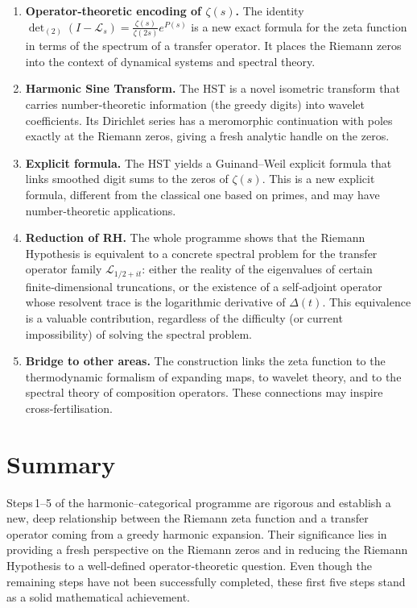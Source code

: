 \documentclass[11pt,a4paper]{article}
\begin{document}
\begin{enumerate}
\item \textbf{Operator‑theoretic encoding of \(\zeta(s)\).}  The identity \(\det_{(2)}(I-\mathcal{L}_s)=\frac{\zeta(s)}{\zeta(2s)}e^{P(s)}\) is a new exact formula for the zeta function in terms of the spectrum of a transfer operator.  It places the Riemann zeros into the context of dynamical systems and spectral theory.

\item \textbf{Harmonic Sine Transform.}  The HST is a novel isometric transform that carries number‑theoretic information (the greedy digits) into wavelet coefficients.  Its Dirichlet series has a meromorphic continuation with poles exactly at the Riemann zeros, giving a fresh analytic handle on the zeros.

\item \textbf{Explicit formula.}  The HST yields a Guinand–Weil explicit formula that links smoothed digit sums to the zeros of \(\zeta(s)\).  This is a new explicit formula, different from the classical one based on primes, and may have number‑theoretic applications.

\item \textbf{Reduction of RH.}  The whole programme shows that the Riemann Hypothesis is equivalent to a concrete spectral problem for the transfer operator family \(\mathcal{L}_{1/2+it}\): either the reality of the eigenvalues of certain finite‑dimensional truncations, or the existence of a self‑adjoint operator whose resolvent trace is the logarithmic derivative of \(\Delta(t)\).  This equivalence is a valuable contribution, regardless of the difficulty (or current impossibility) of solving the spectral problem.

\item \textbf{Bridge to other areas.}  The construction links the zeta function to the thermodynamic formalism of expanding maps, to wavelet theory, and to the spectral theory of composition operators.  These connections may inspire cross‑fertilisation.
\end{enumerate}

\section{Summary}
Steps\,1–5 of the harmonic–categorical programme are rigorous and establish a new, deep relationship between the Riemann zeta function and a transfer operator coming from a greedy harmonic expansion.  Their significance lies in providing a fresh perspective on the Riemann zeros and in reducing the Riemann Hypothesis to a well‑defined operator‑theoretic question.  Even though the remaining steps have not been successfully completed, these first five steps stand as a solid mathematical achievement.
\end{document}
